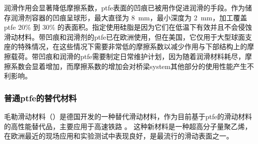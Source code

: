润滑作用会显著降低摩擦系数，\acrlong*{ptfe}表面的凹痕已被用作促进润滑的手段。作为储存润滑剂容器的凹痕呈球形，最大直径为 \qty{8}{mm}，最小深度为 \qty{2}{mm}，加工覆盖\acrlong*{ptfe} 20\% 到 30\% 的表面积。指定使用硅脂是因为它们在低温下有效并且不会侵蚀滑动材料。带凹痕和润滑剂的\acrlong*{ptfe}已在欧洲使用，但在美国，它仅用于大型球面支座的特殊情况，在这些情况下需要非常低的摩擦系数以减少作用与下部结构上的摩擦载荷。带凹痕和润滑的\acrlong*{ptfe}需要制定日常维护计划，因为随着润滑材料耗尽，摩擦系数会显着增加，而摩擦系数的增加会对桥梁\gls*{system}其他部分的使用性能产生不利影响。

\subsubsection{普通\acrlong*{ptfe}的替代材料}

毛勒滑动材料（\msm）是德国开发的一种替代滑动材料，作为目前基于\acrlong*{ptfe}的滑动材料的高性能替代品，主要应用于高速铁路 \cite{maurer2003m}。 这种新材料是一种超高分子量聚乙烯，在欧洲最近的现场应用和实验测试中表现良好，是最流行的滑动表面之一。

